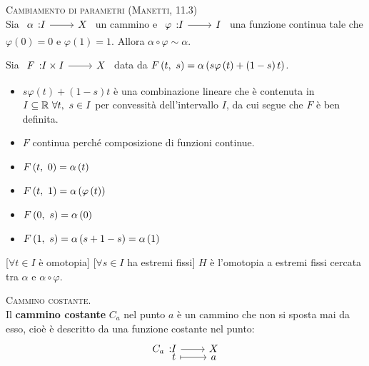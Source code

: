 \begin{lemming}\textsc{Cambiamento di parametri (Manetti, 11.3)}\label{cambiamentodiparametri}\\
	Sia $\funz{\alpha}{I}{X}$ un cammino e $\funz{\varphi}{I}{I}$ una funzione continua tale che $\varphi\left(0\right)=0$ e $\varphi\left(1\right)=1$. Allora $\alpha\circ \varphi\sim\alpha$.
\end{lemming}
\begin{demonstration}
	Sia $\funz{F}{I\times I}{X}$ data da $F\left(t,\ s\right)=\alpha\left(s\varphi\left(t\right)+\left(1-s\right)t\right)$.
	\begin{itemize}
		\item $s\varphi\left(t\right)+\left(1-s\right)t$ è una combinazione lineare che è contenuta in $I\subseteq \mathbb{R}\ \forall t,\ s\in I$ per convessità dell'intervallo $I$, da cui segue che $F$ è ben definita.
		\item $F$ continua perché composizione di funzioni continue.
		\item \parbox[t]{0.38\textwidth}{$F\left(t,\ 0\right)=\alpha\left(t\right)$}
		\item \parbox[t]{0.38\textwidth}{$F\left(t,\ 1\right)=\alpha\left(\varphi\left(t\right)\right)$}
		\item \parbox[t]{0.38\textwidth}{$F\left(0,\ s\right)=\alpha\left(0\right)$}
		\item \parbox[t]{0.38\textwidth}{$F\left(1,\ s\right)=\alpha\left(s+1-s\right)=\alpha\left(1\right)$}
	\end{itemize}
[$\forall t\in I$ è omotopia]
[$\forall s\in I$ ha estremi fissi]
$H$ è l'omotopia a estremi fissi cercata tra $\alpha$ e $\alpha\circ\varphi$.
\end{demonstration}
\begin{define}\textsc{Cammino costante.}\\
	Il \textbf{cammino costante} $C_a$ nel punto $a$ è un cammino che non si sposta mai da esso, cioè è descritto da una funzione costante nel punto:
	\begin{equation}
		\funztot{C_a}{I}{X}{t}{a}
	\end{equation}
\vspace{-6mm}
\end{define}
